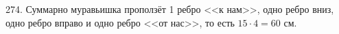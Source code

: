 274. Суммарно муравьишка проползёт 1 ребро <<к нам>>, одно ребро вниз, одно ребро вправо и одно ребро <<от нас>>, то есть $15\cdot4=60$ см.\\
